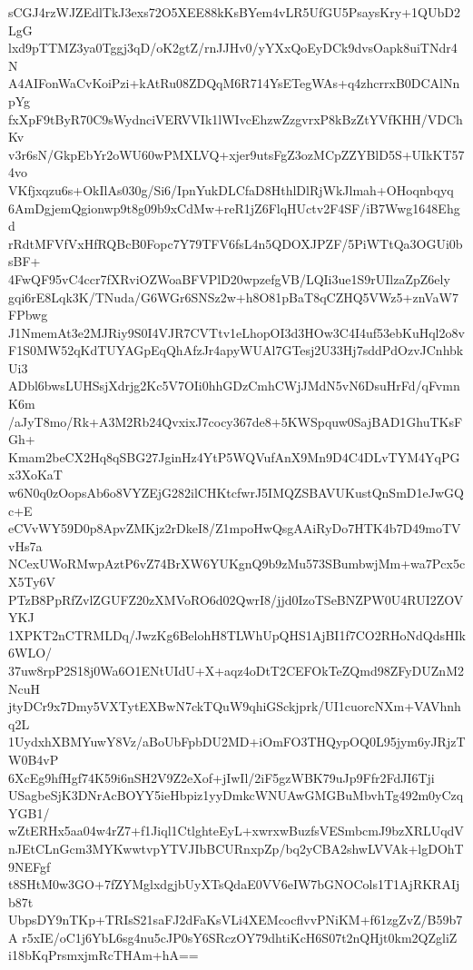 sCGJ4rzWJZEdlTkJ3exs72O5XEE88kKsBYem4vLR5UfGU5PsaysKry+1QUbD2LgG
lxd9pTTMZ3ya0Tggj3qD/oK2gtZ/rnJJHv0/yYXxQoEyDCk9dvsOapk8uiTNdr4N
A4AIFonWaCvKoiPzi+kAtRu08ZDQqM6R714YsETegWAs+q4zhcrrxB0DCAlNnpYg
fxXpF9tByR70C9sWydnciVERVVIk1lWIvcEhzwZzgvrxP8kBzZtYVfKHH/VDChKv
v3r6sN/GkpEbYr2oWU60wPMXLVQ+xjer9utsFgZ3ozMCpZZYBlD5S+UIkKT574vo
VKfjxqzu6s+OkIlAs030g/Si6/IpnYukDLCfaD8HthlDlRjWkJlmah+OHoqnbqyq
6AmDgjemQgionwp9t8g09b9xCdMw+reR1jZ6FlqHUctv2F4SF/iB7Wwg1648Ehgd
rRdtMFVfVxHfRQBcB0Fopc7Y79TFV6fsL4n5QDOXJPZF/5PiWTtQa3OGUi0bsBF+
4FwQF95vC4ccr7fXRviOZWoaBFVPlD20wpzefgVB/LQIi3ue1S9rUIlzaZpZ6ely
gqi6rE8Lqk3K/TNuda/G6WGr6SNSz2w+h8O81pBaT8qCZHQ5VWz5+znVaW7FPbwg
J1NmemAt3e2MJRiy9S0I4VJR7CVTtv1eLhopOI3d3HOw3C4I4uf53ebKuHql2o8v
F1S0MW52qKdTUYAGpEqQhAfzJr4apyWUAl7GTesj2U33Hj7sddPdOzvJCnhbkUi3
ADbl6bwsLUHSsjXdrjg2Kc5V7OIi0hhGDzCmhCWjJMdN5vN6DsuHrFd/qFvmnK6m
/aJyT8mo/Rk+A3M2Rb24QvxixJ7cocy367de8+5KWSpquw0SajBAD1GhuTKsFGh+
Kmam2beCX2Hq8qSBG27JginHz4YtP5WQVufAnX9Mn9D4C4DLvTYM4YqPGx3XoKaT
w6N0q0zOopsAb6o8VYZEjG282ilCHKtcfwrJ5IMQZSBAVUKustQnSmD1eJwGQc+E
eCVvWY59D0p8ApvZMKjz2rDkeI8/Z1mpoHwQsgAAiRyDo7HTK4b7D49moTVvHs7a
NCexUWoRMwpAztP6vZ74BrXW6YUKgnQ9b9zMu573SBumbwjMm+wa7Pcx5cX5Ty6V
PTzB8PpRfZvlZGUFZ20zXMVoRO6d02QwrI8/jjd0IzoTSeBNZPW0U4RUI2ZOVYKJ
1XPKT2nCTRMLDq/JwzKg6BelohH8TLWhUpQHS1AjBI1f7CO2RHoNdQdsHIk6WLO/
37uw8rpP2S18j0Wa6O1ENtUIdU+X+aqz4oDtT2CEFOkTeZQmd98ZFyDUZnM2NcuH
jtyDCr9x7Dmy5VXTytEXBwN7ckTQuW9qhiGSckjprk/UI1cuorcNXm+VAVhnhq2L
1UydxhXBMYuwY8Vz/aBoUbFpbDU2MD+iOmFO3THQypOQ0L95jym6yJRjzTW0B4vP
6XcEg9hfHgf74K59i6nSH2V9Z2eXof+jIwIl/2iF5gzWBK79uJp9Ffr2FdJI6Tji
USagbeSjK3DNrAcBOYY5ieHbpiz1yyDmkcWNUAwGMGBuMbvhTg492m0yCzqYGB1/
wZtERHx5aa04w4rZ7+f1Jiql1CtlghteEyL+xwrxwBuzfsVESmbcmJ9bzXRLUqdV
nJEtCLnGcm3MYKwwtvpYTVJIbBCURnxpZp/bq2yCBA2shwLVVAk+lgDOhT9NEFgf
t8SHtM0w3GO+7fZYMglxdgjbUyXTsQdaE0VV6eIW7bGNOCols1T1AjRKRAIjb87t
UbpsDY9nTKp+TRIsS21saFJ2dFaKsVLi4XEMcocflvvPNiKM+f61zgZvZ/B59b7A
r5xIE/oC1j6YbL6sg4nu5cJP0sY6SRczOY79dhtiKcH6S07t2nQHjt0km2QZgliZ
i18bKqPrsmxjmRcTHAm+hA==
